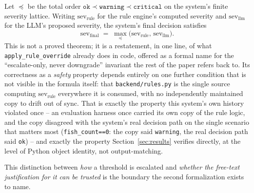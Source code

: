 \begin{formalization}
\label{form:monotonicity}
Let $\preceq$ be the total order $\texttt{ok} \prec \texttt{warning} \prec \texttt{critical}$ on the
system's finite severity lattice. Writing $\mathrm{sev}_\mathrm{rule}$ for the rule engine's
computed severity and $\mathrm{sev}_\mathrm{llm}$ for the LLM's proposed severity, the system's
final decision satisfies
\[
\mathrm{sev}_\mathrm{final} \;=\; \max_{\preceq}\bigl(\mathrm{sev}_\mathrm{rule},\,
\mathrm{sev}_\mathrm{llm}\bigr).
\]
This is not a proved theorem; it is a restatement, in one line, of what
\texttt{apply\_rule\_override} already does in code, offered as a formal name for the
``escalate-only, never downgrade'' invariant the rest of the paper refers back to. Its correctness
as a \emph{safety} property depends entirely on one further condition that is not visible in the
formula itself: that \texttt{backend/rules.py} is the single source computing
$\mathrm{sev}_\mathrm{rule}$ everywhere it is consumed, with no independently maintained copy to
drift out of sync. That is exactly the property this system's own history violated once -- an
evaluation harness once carried its own copy of the rule logic, and the copy disagreed with
the system's real decision path on the single scenario that matters most
(\texttt{fish\_count==0}: the copy said \texttt{warning}, the real decision path said \texttt{ok})
-- and exactly the property
Section~\ref{sec:results} verifies directly, at the level of Python object identity, not
output-matching.
\end{formalization}

This distinction between \emph{how} a threshold is escalated and \emph{whether the free-text
justification for it can be trusted} is the boundary the second formalization exists to name.

